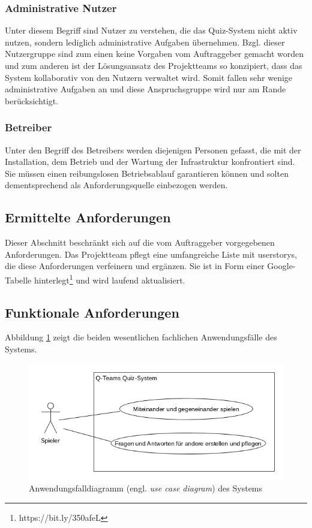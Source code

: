 \documentclass[a4paper,11pt,listof=numbered,glossary=totoc,parskip=half,toc=bib]{scrreprt}
\begin{document}
{\subsubsection{Administrative Nutzer}

Unter diesem Begriff sind Nutzer zu verstehen, die das Quiz-System nicht aktiv nutzen, sondern lediglich administrative Aufgaben übernehmen.
Bzgl. dieser Nutzergruppe sind zum einen keine Vorgaben vom Auftraggeber gemacht worden und zum anderen ist der Lösungsansatz des Projektteams so konzipiert, dass das System kollaborativ von den Nutzern verwaltet wird. 
Somit fallen sehr wenige administrative Aufgaben an und diese Anspruchsgruppe wird nur am Rande berücksichtigt.

\subsubsection{Betreiber}

Unter den Begriff des Betreibers werden diejenigen Personen gefasst, die mit der Installation, dem Betrieb und der Wartung der Infrastruktur konfrontiert sind.
Sie müssen einen reibungslosen Betriebsablauf garantieren können und solten dementsprechend als Anforderungsquelle einbezogen werden.

\subsection{Ermittelte Anforderungen }

Dieser Abschnitt beschränkt sich auf die vom Auftraggeber vorgegebenen Anforderungen. Das Projektteam pflegt eine umfangreiche Liste mit \Glspl{userstory}, die diese Anforderungen verfeinern und ergänzen. Sie ist in Form einer Google-Tabelle hinterlegt\footnote{https://bit.ly/350afeL} und wird laufend aktualisiert.

\subsection{Funktionale Anforderungen}

Abbildung \ref{fig:ucd} zeigt die beiden wesentlichen fachlichen Anwendungsfälle des Systems.

\begin{figure}
	\centering
	\includegraphics[width=0.8\linewidth]{ucd.png}
	\caption{Anwendungsfalldiagramm (engl. \textit{use case diagram}) des Systems}
	\label{fig:ucd}
\end{figure}

}
\end{document}
